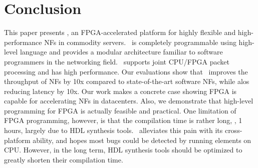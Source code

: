 \section{Conclusion}
\label{sec:conclusion}


This paper presents \name, an FPGA-accelerated platform for highly flexible 
and high-performance NFs in commodity servers.
\name\ is completely programmable using high-level language and provides a 
modular architecture familiar to software programmers in the networking field.
\name\ supports joint CPU/FPGA packet processing and has high performance.
Our evaluations show that \name\ improves the throughput of NFs by 10x compared to
state-of-the-art software NFs, while alos reducing latency by 10x.
%
Our work makes a concrete case showing FPGA is capable for accelerating NFs in datacenters.
Also, we demonstrate that high-level programming for FPGA is actually feasible and practical. 
%
One limitation of FPGA programming, however, is that the compilation time is rather long, \eg, 1 hours, largely
due to HDL synthesis tools.
\name\ alleviates this pain with its cross-platform ability, and hopes most bugs 
could be detected by running elements on CPU.
However, in the long term, HDL synthesis tools should be optimized to greatly 
shorten their compilation time.



